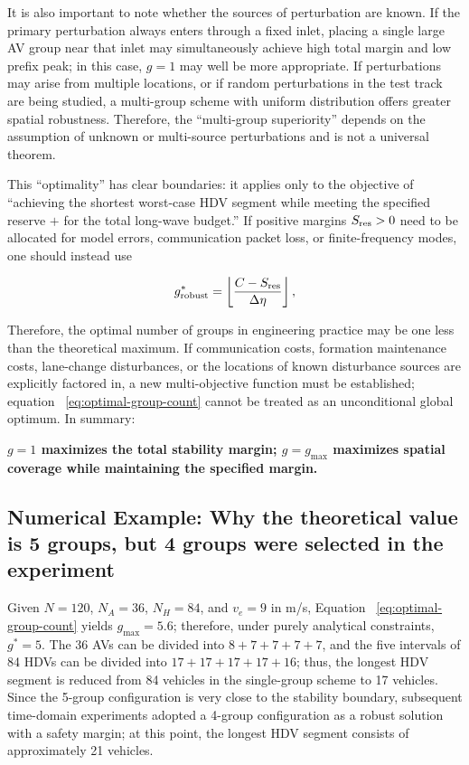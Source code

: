 \documentclass[11pt,a4paper,openany]{book}
\numberwithin{equation}{chapter}
\numberwithin{figure}{chapter}
\numberwithin{table}{chapter}
\begin{document}
It is also important to note whether the sources of perturbation are known. If the primary perturbation always enters through a fixed inlet, placing a single large AV group near that inlet may simultaneously achieve high total margin and low prefix peak; in this case, $g=1$ may well be more appropriate. If perturbations may arise from multiple locations, or if random perturbations in the test track are being studied, a multi-group scheme with uniform distribution offers greater spatial robustness. Therefore, the “multi-group superiority” depends on the assumption of unknown or multi-source perturbations and is not a universal theorem.




This “optimality” has clear boundaries: it applies only to the objective of “achieving the shortest worst-case HDV segment while meeting the specified reserve $+$ for the total long-wave budget.” If positive margins $S_{\rm res}>0$ need to be allocated for model errors, communication packet loss, or finite-frequency modes, one should instead use

\begin{equation}
g_{\rm robust}^*
=\left\lfloor\frac{C-S_{\rm res}}{\Delta\eta}\right\rfloor,
\label{eq:robust-group-count}
\end{equation}

Therefore, the optimal number of groups in engineering practice may be one less than the theoretical maximum. If communication costs, formation maintenance costs, lane-change disturbances, or the locations of known disturbance sources are explicitly factored in, a new multi-objective function must be established; equation ~\eqref{eq:optimal-group-count} cannot be treated as an unconditional global optimum. In summary:




\textbf{$g=1$ maximizes the total stability margin; $g=g_{\max}$ maximizes spatial coverage while maintaining the specified margin.
}

\subsection{Numerical Example: Why the theoretical value is 5 groups, but 4 groups were selected in the experiment}





Given $N=120$, $N_A=36$, $N_H=84$, and $v_e=9$ in m/s, Equation ~\eqref{eq:optimal-group-count} yields $g_{\max}=5.6$; therefore, under purely analytical constraints, $g^*=5$. The 36 AVs can be divided into $8+7+7+7+7$, and the five intervals of 84 HDVs can be divided into $17+17+17+17+16$; thus, the longest HDV segment is reduced from 84 vehicles in the single-group scheme to 17 vehicles. Since the 5-group configuration is very close to the stability boundary, subsequent time-domain experiments adopted a 4-group configuration as a robust solution with a safety margin; at this point, the longest HDV segment consists of approximately 21 vehicles.
\end{document}
